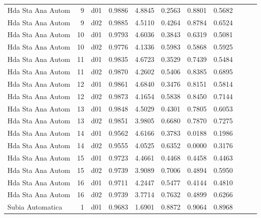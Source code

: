 \begin{landscape}
\begin{longtable}{p{2cm}rrrrrrrrrr}
    Hda Sta Ana Autom  &          9 &     d01 &   0.9886 &  4.8845 &        0.2563 &           0.8801 &  0.5682 \\
    Hda Sta Ana Autom  &          9 &     d02 &   0.9885 &  4.5110 &        0.4264 &           0.8784 &  0.6524 \\
    Hda Sta Ana Autom  &         10 &     d01 &   0.9793 &  4.6036 &        0.3843 &           0.6319 &  0.5081 \\
    Hda Sta Ana Autom  &         10 &     d02 &   0.9776 &  4.1336 &        0.5983 &           0.5868 &  0.5925 \\
    Hda Sta Ana Autom  &         11 &     d01 &   0.9835 &  4.6723 &        0.3529 &           0.7439 &  0.5484 \\
    Hda Sta Ana Autom  &         11 &     d02 &   0.9870 &  4.2602 &        0.5406 &           0.8385 &  0.6895 \\
    Hda Sta Ana Autom  &         12 &     d01 &   0.9861 &  4.6840 &        0.3476 &           0.8151 &  0.5814 \\
    Hda Sta Ana Autom  &         12 &     d02 &   0.9873 &  4.1654 &        0.5838 &           0.8450 &  0.7144 \\
    Hda Sta Ana Autom  &         13 &     d01 &   0.9848 &  4.5029 &        0.4301 &           0.7805 &  0.6053 \\
    Hda Sta Ana Autom  &         13 &     d02 &   0.9851 &  3.9805 &        0.6680 &           0.7870 &  0.7275 \\
    Hda Sta Ana Autom  &         14 &     d01 &   0.9562 &  4.6166 &        0.3783 &           0.0188 &  0.1986 \\
    Hda Sta Ana Autom  &         14 &     d02 &   0.9555 &  4.0525 &        0.6352 &           0.0000 &  0.3176 \\
    Hda Sta Ana Autom  &         15 &     d01 &   0.9723 &  4.4661 &        0.4468 &           0.4458 &  0.4463 \\
    Hda Sta Ana Autom  &         15 &     d02 &   0.9739 &  3.9089 &        0.7006 &           0.4894 &  0.5950 \\
    Hda Sta Ana Autom  &         16 &     d01 &   0.9711 &  4.2447 &        0.5477 &           0.4144 &  0.4810 \\
    Hda Sta Ana Autom  &         16 &     d02 &   0.9739 &  3.7714 &        0.7632 &           0.4899 &  0.6266 \\
     Subia Automatica  &          1 &     d01 &   0.9683 &  1.6901 &        0.8872 &           0.9064 &  0.8968 \\

\end{longtable}
\end{landscape}
